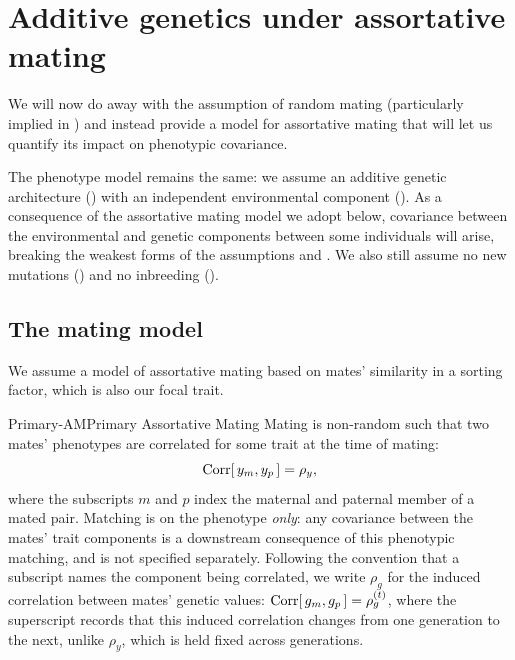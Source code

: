 \documentclass[12pt]{article}
\begin{document}
\section{Additive genetics under assortative mating}\label{sec:am}
We will now do away with the assumption of random mating (particularly implied in ) and instead provide a model for assortative mating that will let us quantify its impact on phenotypic covariance.

The phenotype model remains the same: we assume an additive genetic architecture () with an independent environmental component ().
As a consequence of the assortative mating model we adopt below, covariance between the environmental and genetic components between some individuals will arise, breaking the weakest forms of the assumptions  and .
We also still assume no new mutations () and no inbreeding ().

\subsection{The mating model}
We assume a model of assortative mating based on mates' similarity in a sorting factor, which is also our focal trait.

\begin{assumption}{Primary-AM}{Primary Assortative Mating}
Mating is non-random such that two mates' phenotypes are correlated for some trait at the time of mating:
$$ \mathrm{Corr}[\,y_m, y_p\,] = \rho_y , $$
where the subscripts $m$ and $p$ index the maternal and paternal member of a mated pair.
Matching is on the phenotype \emph{only}: any covariance between the mates' trait components is a downstream consequence of this phenotypic matching, and is not specified separately.
Following the convention that a subscript names the component being correlated, we write $\rho_g$ for the induced correlation between mates' genetic values:
$ \mathrm{Corr}[\,g_m, g_p\,] = \rho_g^{(t)} $, where the superscript records that this induced correlation changes from one generation to the next, unlike $\rho_y$, which is held fixed across generations.
\end{assumption}
\end{document}

